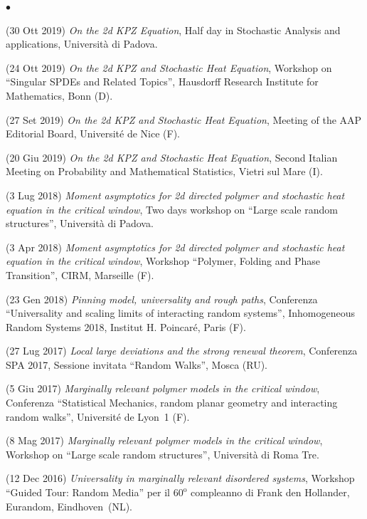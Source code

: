 \documentclass[a4paper,11pt,oneside]{amsart}
\newenvironment{myitemize}{%
\begin{list}{$\bullet$}%
 	{%
	\setlength{\itemsep}{0.3em}%
	\setlength{\topsep}{0.3em}%
	\setlength{\partopsep}{0em}%
	\setlength{\parsep}{0em}%
	\setlength{\parskip}{0em}%
	\setlength\leftmargin{1.5em}%
	\setlength\labelwidth{1.1em}%
	\setlength{\labelsep}{0.4em}%
	}%
	}%
{\end{list}}
\renewenvironment{itemize}{
\begin{myitemize}}%
{\end{myitemize}}
\begin{document}
\begin{itemize}
\item (30 Ott 2019)
\emph{On the 2d KPZ Equation},
Half day in Stochastic Analysis and applications,
Università di Padova.

\item (24 Ott 2019)
\emph{On the 2d KPZ and Stochastic Heat Equation},
Workshop on ``Singular SPDEs and Related Topics'',
Hausdorff Research Institute for Mathematics, Bonn (D).


\item (27 Set 2019)
\emph{On the 2d KPZ and Stochastic Heat Equation},
Meeting of the AAP Editorial Board,
Université de Nice (F).

\item (20 Giu 2019)
\emph{On the 2d KPZ and Stochastic Heat Equation},
Second Italian Meeting on Probability and Mathematical Statistics,
Vietri sul Mare (I).

\item (3 Lug 2018)
\emph{Moment asymptotics for 2d directed polymer and stochastic 
heat equation in the critical window},
Two days workshop on ``Large scale random structures'',
Università di Padova.

\item (3 Apr 2018)
\emph{Moment asymptotics for 2d directed polymer and stochastic 
heat equation in the critical window},
Workshop ``Polymer, Folding and Phase Transition'', CIRM, Marseille (F).

\item (23 Gen 2018)
\emph{Pinning model, universality and rough paths},
Conferenza ``Universality and scaling limits of interacting random systems'',
Inhomogeneous Random Systems 2018, Institut H. Poincaré, Paris (F).

\item (27 Lug 2017)
\emph{Local large deviations and the strong renewal theorem},
Conferenza SPA 2017, Sessione invitata ``Random Walks'', Mosca (RU).

\item (5 Giu 2017)
\emph{Marginally relevant polymer models in the critical window},
Conferenza ``Statistical Mechanics, random planar geometry and interacting random walks'',
Université de Lyon~1 (F).

\item (8 Mag 2017)
\emph{Marginally relevant polymer models in the critical window},
Workshop on ``Large scale random structures'',
Università di Roma Tre.

\item (12 Dec 2016)
\emph{Universality in marginally relevant disordered systems},
Workshop ``Guided Tour: Random Media'' per il $60^{\mathrm{o}}$ compleanno di Frank den Hollander,
Eurandom, Eindhoven~(NL).


\end{itemize}
\end{document}
